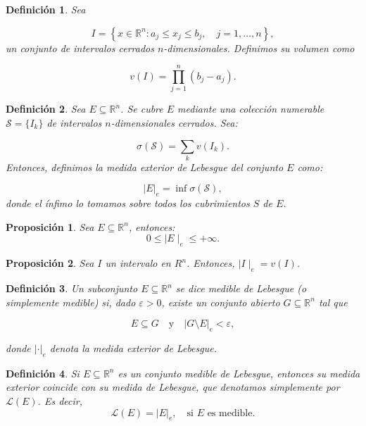 \documentclass{report}
\newtheorem{prop}{Proposición}[section]
\newtheorem{dfn}{Definición}[section]
\begin{document}
\begin{dfn}
Sea

\[
I = \left\{ x \in \mathbb{R}^n : a_j \leq x_j \leq b_j, \quad j = 1, \dots, n \right\},
\]
un conjunto de intervalos cerrados \( n \)-dimensionales. Definimos su \emph{volumen} como

\[
v(I) = \prod_{j=1}^{n} (b_j - a_j).
\]
\end{dfn}

\begin{dfn}
Sea \( E \subseteq \mathbb{R}^n \). Se cubre \( E \) mediante una colección numerable \( \mathcal{S} = \{ I_k \} \) 
de intervalos \( n \)-dimensionales cerrados. Sea:

\[
\sigma(\mathcal{S}) = \sum_{k} v(I_k).
\]
Entonces, definimos la \textit{medida exterior de Lebesgue} del conjunto \( E  \) como:

\begin{equation*}
|E|_e = \inf \sigma(\mathcal{S}),
\end{equation*}
donde el ínfimo lo tomamos sobre todos los cubrimientos $S$ de $E$.
\end{dfn}

\begin{prop}
    Sea \( E \subseteq \mathbb{R}^n \), entonces:
    \begin{equation*}
        0 \leq \mid E \mid_e \leq +\infty.
    \end{equation*}
\end{prop}

\begin{prop}
    Sea $I$ un intervalo en $R^n$. Entonces, $\mid I \mid_e = v(I)$.
\end{prop}


\begin{dfn}
Un subconjunto \( E \subseteq \mathbb{R}^n \) se dice \textit{medible de Lebesgue} (o simplemente \textit{medible}) si, dado \( \varepsilon > 0 \), 
existe un conjunto abierto \( G \subseteq \mathbb{R}^n \) tal que

\[
E \subseteq G \quad \text{y} \quad |G \setminus E|_e < \varepsilon,
\]

donde \( | \cdot |_e \) denota la medida exterior de Lebesgue.
\end{dfn}

\begin{dfn}
Si \( E \subseteq \mathbb{R}^n \) es un conjunto medible de Lebesgue, entonces su \textit{medida exterior} coincide con su \textit{medida de Lebesgue}, 
que denotamos simplemente por \( \mathscr{L}(E) \). Es decir,
\[
\mathscr{L}(E)  = |E|_e, \quad \text{si } E \text{ es medible}.
\]
\end{dfn}
\end{document}
